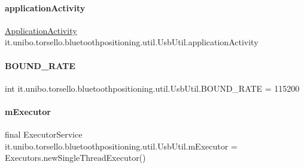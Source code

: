 \paragraph{\texorpdfstring{application\+Activity}{applicationActivity}}
{\footnotesize\ttfamily \hyperlink{classit_1_1unibo_1_1torsello_1_1bluetoothpositioning_1_1activities_1_1ApplicationActivity}{Application\+Activity} it.\+unibo.\+torsello.\+bluetoothpositioning.\+util.\+Usb\+Util.\+application\+Activity\hspace{0.3cm}{\ttfamily [private]}}

\hypertarget{classit_1_1unibo_1_1torsello_1_1bluetoothpositioning_1_1util_1_1UsbUtil_aa1f09cbe9b44a01d9e8e85d2dfe48654_aa1f09cbe9b44a01d9e8e85d2dfe48654}{}\label{classit_1_1unibo_1_1torsello_1_1bluetoothpositioning_1_1util_1_1UsbUtil_aa1f09cbe9b44a01d9e8e85d2dfe48654_aa1f09cbe9b44a01d9e8e85d2dfe48654} 
\paragraph{\texorpdfstring{B\+O\+U\+N\+D\+\_\+\+R\+A\+TE}{BOUND\_RATE}}
{\footnotesize\ttfamily int it.\+unibo.\+torsello.\+bluetoothpositioning.\+util.\+Usb\+Util.\+B\+O\+U\+N\+D\+\_\+\+R\+A\+TE = 115200\hspace{0.3cm}{\ttfamily [private]}}

\hypertarget{classit_1_1unibo_1_1torsello_1_1bluetoothpositioning_1_1util_1_1UsbUtil_a0b5ea6576e2234b8f7a43343b598d637_a0b5ea6576e2234b8f7a43343b598d637}{}\label{classit_1_1unibo_1_1torsello_1_1bluetoothpositioning_1_1util_1_1UsbUtil_a0b5ea6576e2234b8f7a43343b598d637_a0b5ea6576e2234b8f7a43343b598d637} 
\paragraph{\texorpdfstring{m\+Executor}{mExecutor}}
{\footnotesize\ttfamily final Executor\+Service it.\+unibo.\+torsello.\+bluetoothpositioning.\+util.\+Usb\+Util.\+m\+Executor = Executors.\+new\+Single\+Thread\+Executor()\hspace{0.3cm}{\ttfamily [private]}}


